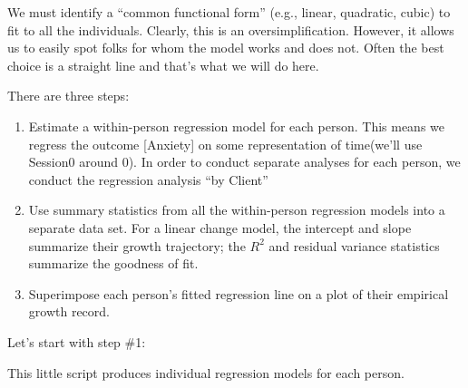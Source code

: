 \documentclass[
  11pt,
]{book}
\newenvironment{Shaded}{\begin{snugshade}}{\end{snugshade}}
\newcommand{\AttributeTok}[1]{\textcolor[rgb]{0.77,0.63,0.00}{#1}}
\newcommand{\ControlFlowTok}[1]{\textcolor[rgb]{0.13,0.29,0.53}{\textbf{#1}}}
\newcommand{\FunctionTok}[1]{\textcolor[rgb]{0.00,0.00,0.00}{#1}}
\newcommand{\NormalTok}[1]{#1}
\newcommand{\OtherTok}[1]{\textcolor[rgb]{0.56,0.35,0.01}{#1}}
\newcommand{\SpecialCharTok}[1]{\textcolor[rgb]{0.00,0.00,0.00}{#1}}
\providecommand{\tightlist}{%
  \setlength{\itemsep}{0pt}\setlength{\parskip}{0pt}}
\begin{document}
We must identify a ``common functional form'' (e.g., linear, quadratic, cubic) to fit to all the individuals. Clearly, this is an oversimplification. However, it allows us to easily spot folks for whom the model works and does not. Often the best choice is a straight line and that's what we will do here.

There are three steps:

\begin{enumerate}
\def\labelenumi{\arabic{enumi}.}
\tightlist
\item
  Estimate a within-person regression model for each person. This means we regress the outcome {[}Anxiety{]} on some representation of time(we'll use Session0 around 0). In order to conduct separate analyses for each person, we conduct the regression analysis ``by Client''
\item
  Use summary statistics from all the within-person regression models into a separate data set. For a linear change model, the intercept and slope summarize their growth trajectory; the \(R^2\) and residual variance statistics summarize the goodness of fit.
\item
  Superimpose each person's fitted regression line on a plot of their empirical growth record.
\end{enumerate}

Let's start with step \#1:

This little script produces individual regression models for each person.

\begin{Shaded}
\end{Shaded}
\end{document}
